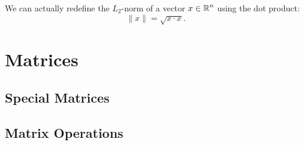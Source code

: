 \documentclass[11pt, oneside]{article}   	%
\begin{document}
We can actually redefine the $L_2$-norm of a vector $x\in\operatorname{\mathbb{R}}^n$ using the dot product:
\[
\|x\| = \sqrt{x \cdot x}.
\]
\section{Matrices}

\subsection{Special Matrices}

\subsection{Matrix Operations}
\end{document}
